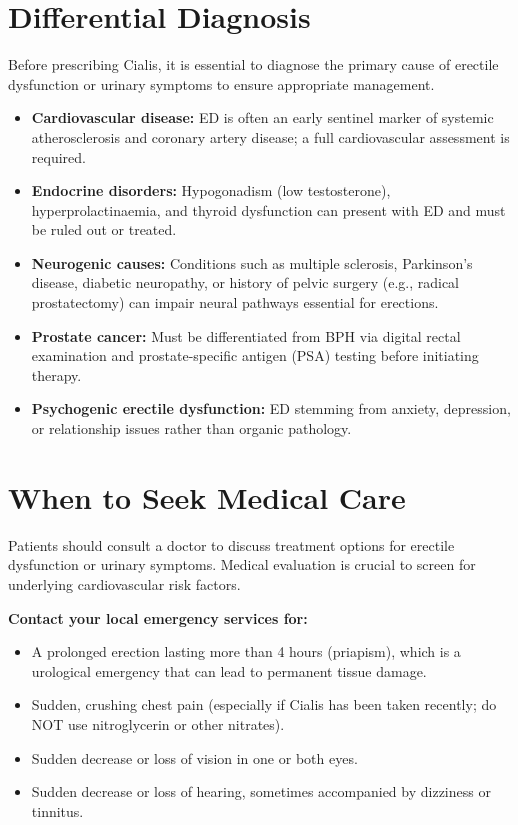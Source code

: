 \section*{Differential Diagnosis}
Before prescribing Cialis, it is essential to diagnose the primary cause of erectile dysfunction or urinary symptoms to ensure appropriate management.
\begin{itemize}
    \item \textbf{Cardiovascular disease:} ED is often an early sentinel marker of systemic atherosclerosis and coronary artery disease; a full cardiovascular assessment is required.
    \item \textbf{Endocrine disorders:} Hypogonadism (low testosterone), hyperprolactinaemia, and thyroid dysfunction can present with ED and must be ruled out or treated.
    \item \textbf{Neurogenic causes:} Conditions such as multiple sclerosis, Parkinson's disease, diabetic neuropathy, or history of pelvic surgery (e.g., radical prostatectomy) can impair neural pathways essential for erections.
    \item \textbf{Prostate cancer:} Must be differentiated from BPH via digital rectal examination and prostate-specific antigen (PSA) testing before initiating therapy.
    \item \textbf{Psychogenic erectile dysfunction:} ED stemming from anxiety, depression, or relationship issues rather than organic pathology.
\end{itemize}

\section*{When to Seek Medical Care}
Patients should consult a doctor to discuss treatment options for erectile dysfunction or urinary symptoms. Medical evaluation is crucial to screen for underlying cardiovascular risk factors.

\textbf{Contact your local emergency services for:}
\begin{itemize}
    \item A prolonged erection lasting more than 4 hours (priapism), which is a urological emergency that can lead to permanent tissue damage.
    \item Sudden, crushing chest pain (especially if Cialis has been taken recently; do NOT use nitroglycerin or other nitrates).
    \item Sudden decrease or loss of vision in one or both eyes.
    \item Sudden decrease or loss of hearing, sometimes accompanied by dizziness or tinnitus.
\end{itemize}

